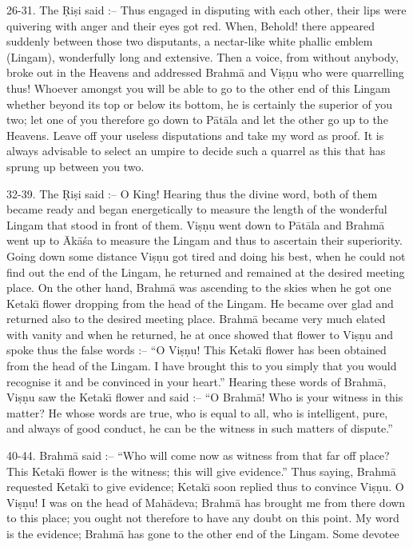 26-31. The \d{R}i\d{s}i said :-- Thus engaged in disputing with each other, their lips were quivering with anger and their eyes got red. When, Behold! there appeared suddenly between those two disputants, a nectar-like white phallic emblem (Lingam), wonderfully long and extensive. Then a voice, from without anybody, broke out in the Heavens and addressed Brahm\=a and Vi\d{s}\d{n}u who were quarrelling thus! Whoever amongst you will be able to go to the other end of this Lingam whether beyond its top or below its bottom, he is certainly the superior of you two; let one of you therefore go down to P\=at\=ala and let the other go up to the Heavens. Leave off your useless disputations and take my word as proof. It is always advisable to select an umpire to decide such a quarrel as this that has sprung up between you two.

32-39. The \d{R}i\d{s}i said :-- O King! Hearing thus the divine word, both of them became ready and began energetically to measure the length of the wonderful Lingam that stood in front of them. Vi\d{s}\d{n}u went down to P\=at\=ala and Brahm\=a went up to \=Ak\=a\'sa to measure the Lingam and thus to ascertain their superiority. Going down some distance Vi\d{s}\d{n}u got tired and doing his best, when he could not find out the end of the Lingam, he returned and remained at the desired meeting place. On the other hand, Brahm\=a was ascending to the skies when he got one Ketak\={\i} flower dropping from the head of the Lingam. He became over glad and returned also to the desired meeting place. Brahm\=a became very much elated with vanity and when he returned, he at once showed that flower to Vi\d{s}\d{n}u and spoke thus the false words :-- ``O Vi\d{s}\d{n}u! This Ketak\={\i} flower has been obtained from the head of the Lingam. I have brought this to you simply that you would recognise it and be convinced in your heart.'' Hearing these words of Brahm\=a, Vi\d{s}\d{n}u saw the Ketak\={\i} flower and said :-- ``O Brahm\=a! Who is your witness in this matter? He whose words are true, who is equal to all, who is intelligent, pure, and always of good conduct, he can be the witness in such matters of dispute.''

40-44. Brahm\=a said :-- ``Who will come now as witness from that far off place? This Ketak\={\i} flower is the witness; this will give evidence.'' Thus saying, Brahm\=a requested Ketak\={\i} to give evidence; Ketak\={\i} soon replied thus to convince Vi\d{s}\d{n}u. O Vi\d{s}\d{n}u! I was on the head of Mah\=adeva; Brahm\=a has brought me from there down to this place; you ought not therefore to have any doubt on this point. My word is the evidence; Brahm\=a has gone to the other end of the Lingam. Some devotee

